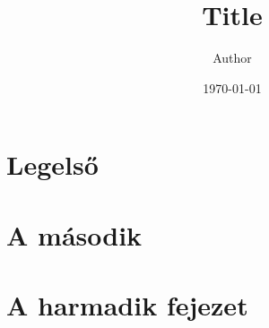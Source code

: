 \documentclass{book}
\title{Title}
\author{Author}
\date{\today}
\begin{document}
\frontmatter

\maketitle
\tableofcontents

\mainmatter

\chapter{Legelső}
\hulipsum[3]
\cite{abrharber03}
\cite{bujfaz}
\hulipsum[1]
\cite{g4gbin}
\chapter{A második}
\hulipsum
\chapter{A harmadik fejezet}
\hulipsum[2]
\cite{knuth84}
\cite{lamport94}
\cite{tomacs21}

\backmatter



\end{document}
